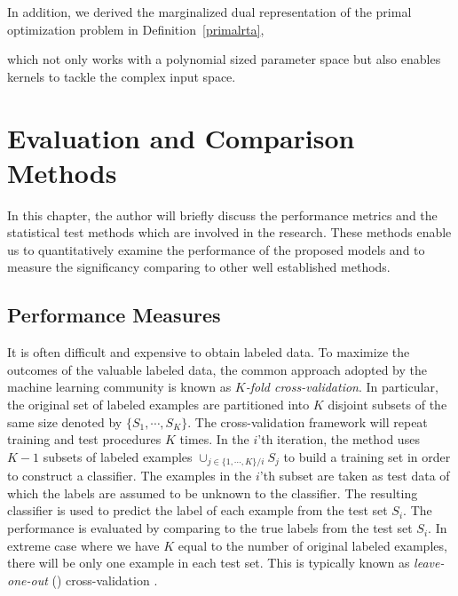 {In addition, we derived the marginalized dual representation of the primal optimization problem in Definition~\ref{primalrta},

which not only works with a polynomial sized parameter space but also enables kernels to tackle the complex input space.



%
\iffalse
\chapter{Evaluation and Comparison Methods} \label{ch_ecm}

In this chapter, the author will briefly discuss the performance metrics and the statistical test methods which are involved in the research. 
These methods enable us to quantitatively examine the performance of the proposed models and to measure the significancy comparing to other well established methods.

%
\section{Performance Measures} \label{sc_pm}

It is often difficult and expensive to obtain labeled data. 
To maximize the outcomes of the valuable labeled data, the common approach adopted by the machine learning community is known as \textit{$K$-fold cross-validation}.
In particular, the original set of labeled examples are partitioned into $K$ disjoint subsets of the same size denoted by $\{S_1,\cdots,S_K\}$.
The cross-validation framework will repeat training and test procedures $K$ times.
In the $i$'th iteration, the method uses $K-1$ subsets of labeled examples $\cup_{j\in\{1,\cdots,K\}/i}S_j$ to build a training set in order to construct a classifier.
The examples in the $i$'th subset are taken as test data of which the labels are assumed to be unknown to the classifier.
The resulting classifier is used to predict the label of each example from the test set $S_i$.
The performance is evaluated by comparing to the true labels from the test set $S_i$.
In extreme case where we have $K$ equal to the number of original labeled examples, there will be only one example in each test set.
This is typically known as \textit{leave-one-out} (\loo) {cross-validation} .

}
